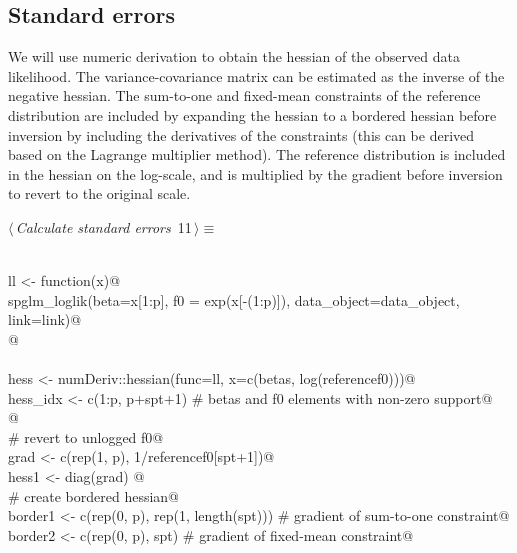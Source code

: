 \documentclass[reqno]{amsart}
\renewcommand{\NWtarget}[2]{\hypertarget{#1}{#2}}
\begin{document}
\subsection{Standard errors}

We will use numeric derivation to obtain the hessian of the observed data likelihood. The variance-covariance matrix can be estimated as the inverse of the negative hessian. The sum-to-one and fixed-mean constraints of the reference distribution are included by expanding the hessian to a bordered hessian before inversion by including the derivatives of the constraints (this can be derived based on the Lagrange multiplier method). The reference distribution is included in the hessian on the log-scale, and is multiplied by the gradient before inversion to revert to the original scale.

\begin{flushleft} \small\label{scrap13}\raggedright\small
\NWtarget{nuweb11}{} $\langle\,${\itshape Calculate standard errors}\nobreak\ {\footnotesize {11}}$\,\rangle\equiv$
\vspace{-1ex}
\begin{list}{}{} \item
\mbox{}\verb@@\\
\mbox{}\verb@  ll <- function(x){@\\
\mbox{}\verb@    spglm_loglik(beta=x[1:p], f0 = exp(x[-(1:p)]), data_object=data_object, link=link)@\\
\mbox{}\verb@  }@\\
\mbox{}\verb@@\\
\mbox{}\verb@  hess <- numDeriv::hessian(func=ll,  x=c(betas, log(referencef0)))@\\
\mbox{}\verb@  hess_idx <- c(1:p, p+spt+1) # betas and f0 elements with non-zero support@\\
\mbox{}\verb@  @\\
\mbox{}\verb@  # revert to unlogged f0@\\
\mbox{}\verb@  grad <- c(rep(1, p), 1/referencef0[spt+1])@\\
\mbox{}\verb@  hess1 <- diag(grad) %*% hess[hess_idx, hess_idx] %*% diag(grad)@\\
\mbox{}\verb@  @\\
\mbox{}\verb@  # create bordered hessian@\\
\mbox{}\verb@  border1 <- c(rep(0, p), rep(1, length(spt)))  # gradient of sum-to-one constraint@\\
\mbox{}\verb@  border2 <- c(rep(0, p), spt)          # gradient of fixed-mean constraint@\\

\end{list}
\end{flushleft}
\end{document}

